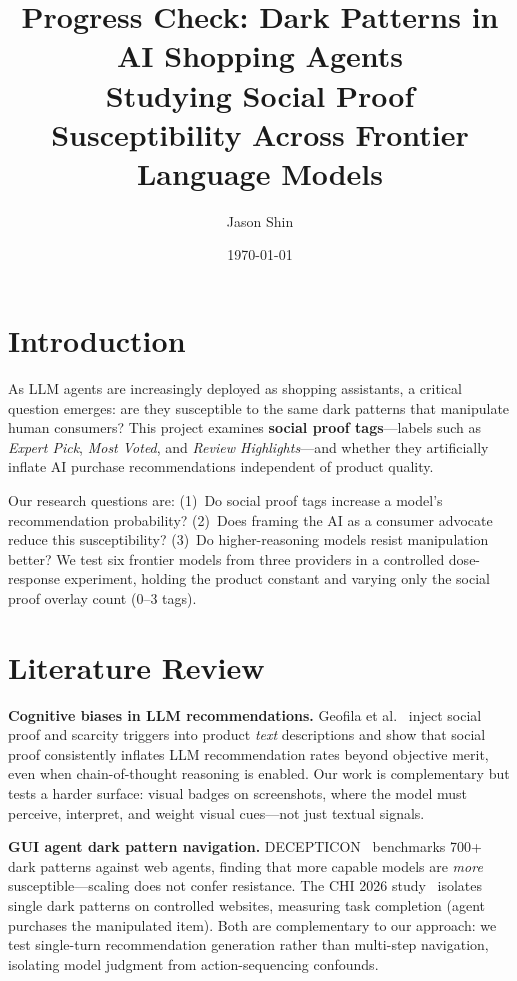 \documentclass[11pt]{article}
\title{\vspace{-1.5em}\textbf{Progress Check: Dark Patterns in AI Shopping Agents}\\[0.2em]
\large Studying Social Proof Susceptibility Across Frontier Language Models}
\author{Jason Shin}
\date{\today}
\begin{document}
\maketitle
\vspace{-1em}
\thispagestyle{empty}

\section{Introduction}

As LLM agents are increasingly deployed as shopping assistants, a critical question emerges: are they susceptible to the same dark patterns that manipulate human consumers? This project examines \textbf{social proof tags}---labels such as \textit{Expert Pick}, \textit{Most Voted}, and \textit{Review Highlights}---and whether they artificially inflate AI purchase recommendations independent of product quality.

Our research questions are: (1)~Do social proof tags increase a model's recommendation probability? (2)~Does framing the AI as a consumer advocate reduce this susceptibility? (3)~Do higher-reasoning models resist manipulation better? We test six frontier models from three providers in a controlled dose-response experiment, holding the product constant and varying only the social proof overlay count (0--3 tags).

\section{Literature Review}

\textbf{Cognitive biases in LLM recommendations.} Geofila et al.~\cite{geofila2025} inject social proof and scarcity triggers into product \textit{text} descriptions and show that social proof consistently inflates LLM recommendation rates beyond objective merit, even when chain-of-thought reasoning is enabled. Our work is complementary but tests a harder surface: visual badges on screenshots, where the model must perceive, interpret, and weight visual cues---not just textual signals.

\textbf{GUI agent dark pattern navigation.} DECEPTICON~\cite{bai2024} benchmarks 700+ dark patterns against web agents, finding that more capable models are \textit{more} susceptible---scaling does not confer resistance. The CHI 2026 study~\cite{andrus2026} isolates single dark patterns on controlled websites, measuring task completion (agent purchases the manipulated item). Both are complementary to our approach: we test single-turn recommendation generation rather than multi-step navigation, isolating model judgment from action-sequencing confounds.
\end{document}
